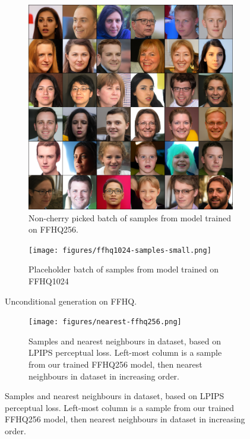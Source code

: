 \begin{figure}[ht]
    \centering
    \begin{subfigure}[b]{0.47\textwidth}
        \centering
        \includegraphics[width=1.0\textwidth]{figures/ffhq256-samples-small.png}
        \caption{
            Non-cherry picked batch of samples from model trained on FFHQ256.
        }
    \end{subfigure}
    \hfill
    \begin{subfigure}[b]{0.47\textwidth}
        \centering
        \texttt{[image: figures/ffhq1024-samples-small.png]}
        \caption{
            Placeholder batch of samples from model trained on FFHQ1024
        }
    \end{subfigure}
    \caption{Unconditional generation on FFHQ.}
\end{figure}

\begin{figure}[ht]
    \centering
    \begin{subfigure}[b]{\textwidth}
        \centering
        \texttt{[image: figures/nearest-ffhq256.png]}
        \caption{
            Samples and nearest neighbours in dataset, based on LPIPS perceptual
            loss. Left-most column is a sample from our trained FFHQ256 model,
            then nearest neighbours in dataset in increasing order.
        }
    \end{subfigure}
\end{figure}

